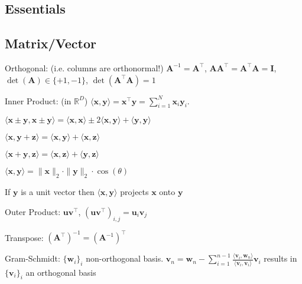 \documentclass[a4paper, 11pt, landscape]{article}
\begin{document}
\begin{multicols*}{3}

\section{Essentials}
\subsection{Matrix/Vector}
\begin{compactdesc}
	\item[Orthogonal:] (i.e. columns are orthonormal!) $\mathbf{A}^{-1} = \mathbf{A}^\top$, $\mathbf{A} \mathbf{A}^\top = \mathbf{A}^\top \mathbf{A} = \mathbf{I}$, $\operatorname{det}(\mathbf{A}) \in \{+1, -1\}$, $\operatorname{det}(\mathbf{A}^\top \mathbf{A}) = 1$
	\item[Inner Product:] (in $\mathbb{R}^D$) $\langle \mathbf{x}, \mathbf{y} \rangle = \mathbf{x}^\top \mathbf{y} = \sum_{i=1}^{N} \mathbf{x}_i \mathbf{y}_i$.
	\begin{inparaitem}[\color{red}\textbullet]
		\item $\langle \mathbf{x} \pm \mathbf{y}, \mathbf{x} \pm \mathbf{y} \rangle = \langle \mathbf{x}, \mathbf{x} \rangle \pm 2 \langle \mathbf{x}, \mathbf{y} \rangle + \langle \mathbf{y}, \mathbf{y} \rangle$
		\item $\langle \mathbf{x}, \mathbf{y} + \mathbf{z} \rangle = \langle \mathbf{x}, \mathbf{y} \rangle + \langle \mathbf{x}, \mathbf{z} \rangle$
		\item $\langle \mathbf{x} + \mathbf{y}, \mathbf{z} \rangle = \langle \mathbf{x}, \mathbf{z} \rangle + \langle \mathbf{y}, \mathbf{z} \rangle$
		\item $\langle \mathbf{x}, \mathbf{y} \rangle = \|\mathbf{x}\|_2 \cdot \|\mathbf{y}\|_2 \cdot \cos(\theta)$
		\item If $\mathbf{y}$ is a unit vector then $\langle \mathbf{x}, \mathbf{y} \rangle$ projects $\mathbf{x}$ onto $\mathbf{y}$
	\end{inparaitem}
	\item[Outer Product:] $\mathbf{u} \mathbf{v}^\top$, $(\mathbf{u} \mathbf{v}^\top)_{i, j} = \mathbf{u}_i \mathbf{v}_j$
	\item[Transpose:] $(\mathbf{A}^\top)^{-1} = (\mathbf{A}^{-1})^\top$
	\item[Gram-Schmidt:] $\{\mathbf{w}_i\}_i$ non-orthogonal basis. $\mathbf{v}_n = \mathbf{w}_n - \sum_{i=1}^{n-1} \frac{\langle \mathbf{v}_i, \mathbf{w}_n \rangle}{\langle \mathbf{v}_i, \mathbf{v}_i \rangle} \mathbf{v}_i$ results in $\{\mathbf{v}_i\}_i$ an orthogonal basis
\end{compactdesc}


\end{multicols*}
\end{document}
